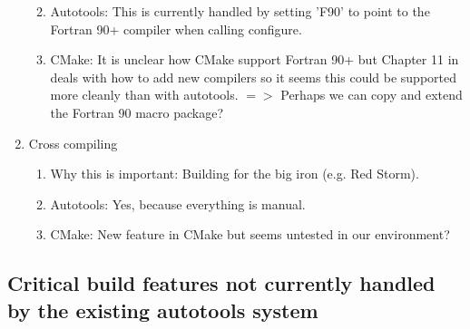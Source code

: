 \documentclass[pdf,ps2pdf,11pt]{SANDreport}
\begin{document}
\begin{enumerate}
\begin{enumerate}
  {}\item Autotools: This is currently handled by setting 'F90' to
  point to the Fortran 90+ compiler when calling configure.

  {}\item CMake: It is unclear how CMake support Fortran 90+ but
  Chapter 11 in {}\cite{MasteringCMake_fourth} deals with how to add
  new compilers so it seems this could be supported more cleanly
  than with autotools. $=>$ Perhaps we can copy and extend the
  Fortran 90 macro package?

  \end{enumerate}

{}\item Cross compiling

  \begin{enumerate}

  {}\item Why this is important: Building for the big iron (e.g. Red Storm).

  {}\item Autotools: Yes, because everything is manual.

  {}\item CMake: New feature in CMake but seems untested in our
  environment?

  \end{enumerate}

\end{enumerate}

%
{}\subsection{Critical build features not currently handled by the
existing autotools system}
%
\end{document}
